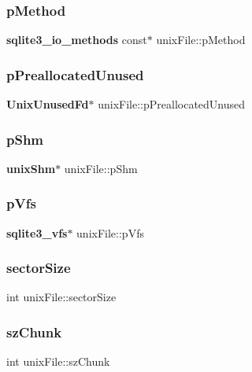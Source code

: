 \subsubsection{pMethod}
{\footnotesize\ttfamily \textbf{ sqlite3\+\_\+io\+\_\+methods} const$\ast$ unix\+File\+::p\+Method}

\mbox{\label{structunix_file_ab30f660bed6da02a9c438ba6aa7260c9}} 
\subsubsection{pPreallocatedUnused}
{\footnotesize\ttfamily \textbf{ Unix\+Unused\+Fd}$\ast$ unix\+File\+::p\+Preallocated\+Unused}

\mbox{\label{structunix_file_a53c653bd73cdc6f518ecffe95062e91a}} 
\subsubsection{pShm}
{\footnotesize\ttfamily \textbf{ unix\+Shm}$\ast$ unix\+File\+::p\+Shm}

\mbox{\label{structunix_file_a048d696479bb2544ab2cec1ac9a75d67}} 
\subsubsection{pVfs}
{\footnotesize\ttfamily \textbf{ sqlite3\+\_\+vfs}$\ast$ unix\+File\+::p\+Vfs}

\mbox{\label{structunix_file_af7782ba6289e49df63dcfa3c476fb702}} 
\subsubsection{sectorSize}
{\footnotesize\ttfamily int unix\+File\+::sector\+Size}

\mbox{\label{structunix_file_a5f6307d3446ce1b149df756c00c3bd2e}} 
\subsubsection{szChunk}
{\footnotesize\ttfamily int unix\+File\+::sz\+Chunk}

